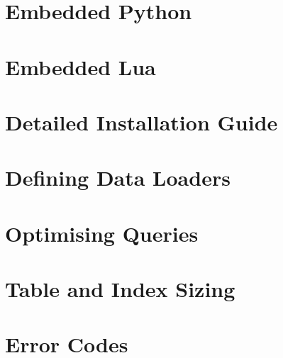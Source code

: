 \documentclass{scrreprt}
\begin{document}
\chapter{Embedded Python}\label{chpt_pythonemb}

\chapter{Embedded Lua}\label{chpt_luaemb}

\chapter{Detailed Installation Guide}\label{chpt_install}

\chapter{Defining Data Loaders}\label{chpt_loader}

\chapter{Optimising Queries}\label{chpt_opt}


\chapter{Table and Index Sizing}\label{chpt_sizing}

\chapter{Error Codes}\label{chpt_errors}
\end{document}
